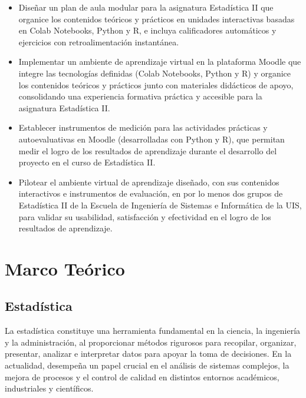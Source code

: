 \documentclass[letter,oneside,12pt,spanish]{report}
\begin{document}
\begin{itemize}
    \item Diseñar un plan de aula modular para la asignatura Estadística II que organice los contenidos teóricos y prácticos en 
    unidades interactivas basadas en Colab Notebooks, Python y R, e incluya calificadores automáticos y ejercicios con retroalimentación 
    instantánea.
    
    \item Implementar un ambiente de aprendizaje virtual en la plataforma Moodle que integre las tecnologías definidas (Colab Notebooks, 
    Python y R) y organice los contenidos teóricos y prácticos junto con materiales didácticos de apoyo, consolidando una experiencia 
    formativa práctica y accesible para la asignatura Estadística II.
    
    \item Establecer instrumentos de medición para las actividades prácticas y autoevaluativas en Moodle (desarrolladas con Python y R), 
    que permitan medir el logro de los resultados de aprendizaje durante el desarrollo del proyecto en el curso de Estadística II.

    \item Pilotear el ambiente virtual de aprendizaje diseñado, con sus contenidos interactivos e instrumentos de evaluación, en por lo 
    menos dos grupos de Estadística II de la Escuela de Ingeniería de Sistemas e Informática de la UIS, para validar su 
    usabilidad, satisfacción y efectividad en el logro de los resultados de aprendizaje.

\end{itemize}


\newpage

\chapter{Marco Teórico}

\section{Estadística}

La estadística constituye una herramienta fundamental en la ciencia, la ingeniería y la administración, al proporcionar métodos rigurosos para recopilar, organizar, presentar, analizar e interpretar datos para apoyar la toma de decisiones. En la actualidad, desempeña un papel crucial en el análisis de sistemas complejos, la mejora de procesos y el control de calidad en distintos entornos académicos, industriales y científicos.
\end{document}
